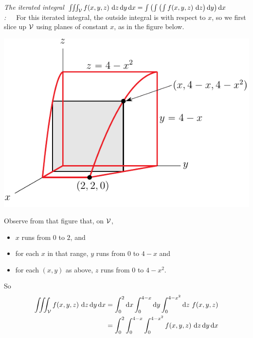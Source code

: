 \begin{eg}
\noindent
\emph{The iterated integral 
   $\tripInt_\cV f(x, y, z)\ \dee{z}\,\dee{y} \,\dee{x}
     =\int\left(\int\left(\int f(x, y, z)\ \dee{z}\right)\dee{y}\right)\dee{x} $:}\ \ \ 
For this iterated integral, the outside integral is with respect to
$x$, so we first slice up $\mathcal{V}$ using planes of constant $x$,
as in the figure below.
\begin{nfig}
\begin{center}
    \includegraphics{limits3dD.pdf}
\end{center}
\end{nfig}
Observe from that figure that, on $\mathcal{V}$,
\begin{itemize}
\item
$x$ runs from $0$ to $2$, and
\item
for each $x$ in that range, $y$ runs from $0$ to $4-x$ and
\item
for each $(x,y)$ as above,
$z$ runs from $0$ to $4-x^2$.
\end{itemize}
So
\begin{align*}
\tripInt_\cV f(x, y, z)\ \dee{z}\,\dee{y} \,\dee{x}
&=\int_0^2 \dee{x} \int_0^{4-x} \dee{y}\int_0^{4-x^2}\dee{z}\  f(x, y, z) \\
&=\int_0^2  \int_0^{4-x} \int_0^{4-x^2}f(x, y, z)\ \dee{z}\,\dee{y}\,\dee{x}
\end{align*}


\end{eg}
